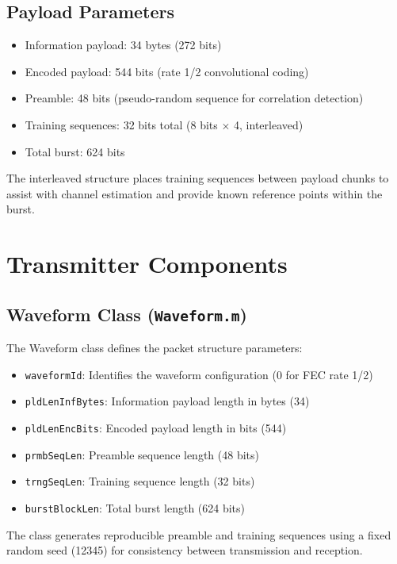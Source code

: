 \documentclass[12pt]{article}
\begin{document}
\subsection{Payload Parameters}
\begin{itemize}
    \item Information payload: 34 bytes (272 bits)
    \item Encoded payload: 544 bits (rate 1/2 convolutional coding)
    \item Preamble: 48 bits (pseudo-random sequence for correlation detection)
    \item Training sequences: 32 bits total (8 bits $\times$ 4, interleaved)
    \item Total burst: 624 bits
\end{itemize}

The interleaved structure places training sequences between payload chunks to assist with channel estimation and provide known reference points within the burst.

\section{Transmitter Components}

\subsection{Waveform Class (\texttt{Waveform.m})}
The Waveform class defines the packet structure parameters:
\begin{itemize}
    \item \texttt{waveformId}: Identifies the waveform configuration (0 for FEC rate 1/2)
    \item \texttt{pldLenInfBytes}: Information payload length in bytes (34)
    \item \texttt{pldLenEncBits}: Encoded payload length in bits (544)
    \item \texttt{prmbSeqLen}: Preamble sequence length (48 bits)
    \item \texttt{trngSeqLen}: Training sequence length (32 bits)
    \item \texttt{burstBlockLen}: Total burst length (624 bits)
\end{itemize}

The class generates reproducible preamble and training sequences using a fixed random seed (12345) for consistency between transmission and reception.
\end{document}
